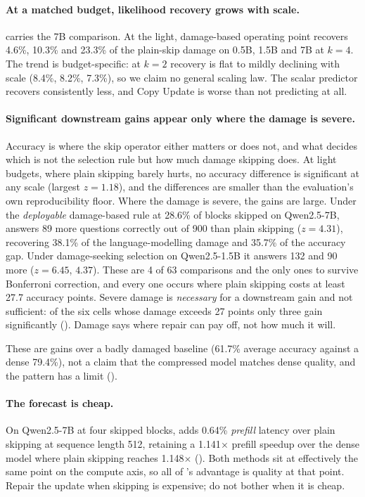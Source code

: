 \paragraph{At a matched budget, likelihood recovery grows with scale.}  carries the 7B comparison. At the light, damage-based
operating point \mname recovers
4.6\%, 10.3\% and 23.3\% of the plain-skip damage on 0.5B, 1.5B and 7B at $k=4$. The trend is
budget-specific: at $k=2$ recovery is flat to mildly declining with scale (8.4\%, 8.2\%,
7.3\%), so we claim no general scaling law. The scalar predictor recovers consistently less, and Copy Update is
worse than not predicting at all.

\paragraph{Significant downstream gains appear only where the damage is severe.} Accuracy is
where the skip operator either matters or does not, and what decides which is not the
selection rule but how much damage skipping does. At light budgets, where plain skipping
barely hurts, no accuracy difference is significant at any scale (largest $z=1.18$),
and the differences are smaller than the evaluation's own reproducibility floor. Where the
damage is severe, the gains are large. Under the \emph{deployable} damage-based rule at
28.6\% of blocks skipped on Qwen2.5-7B, \mname answers 89 more questions
correctly out of 900 than plain skipping ($z=4.31$), recovering 38.1\% of
the language-modelling damage and 35.7\% of the accuracy gap. Under damage-seeking
selection on Qwen2.5-1.5B it answers 132 and 90 more ($z=6.45$,
$4.37$). These are 4 of 63 comparisons and the only ones to survive
Bonferroni correction, and every one occurs where plain skipping costs at least 27.7 accuracy
points. Severe damage is \emph{necessary} for a downstream gain and not sufficient: of the six
cells whose damage exceeds 27 points only three gain significantly ().
Damage says where repair can pay off, not how much it will.

These are gains over a badly damaged baseline (61.7\% average accuracy against a dense 79.4\%),
not a claim that the compressed model matches dense quality, and the pattern has a limit
().

\paragraph{The forecast is cheap.} On Qwen2.5-7B at four skipped blocks, \mname adds
0.64\% \emph{prefill} latency over plain skipping at sequence length 512, retaining a
1.141$\times$ prefill speedup over the dense model where plain skipping reaches
1.148$\times$ (). Both methods sit at effectively the same point on
the compute axis, so all of \mname's advantage is quality at that point. Repair the update
when skipping is expensive; do not bother when it is cheap.

